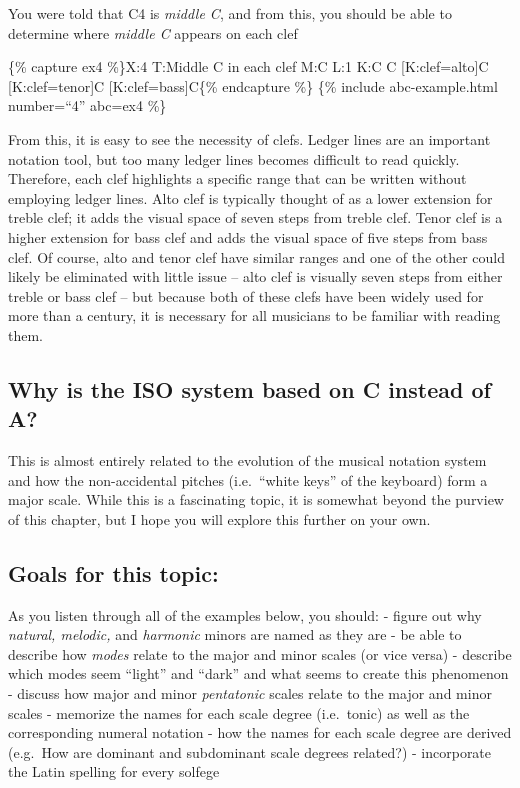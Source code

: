 \documentclass{book}
\begin{document}
You were told that C4 is \emph{middle C}, and from this, you should be able to
determine where \emph{middle C} appears on each clef

\{\% capture ex4 \%\}X:4 T:Middle C in each clef M:C L:1 K:C C\textbar{}
{[}K:clef=alto{]}C\textbar{} {[}K:clef=tenor{]}C\textbar{}
{[}K:clef=bass{]}C\textbar{]}\{\% endcapture \%\} \{\% include
abc-example.html number=``4'' abc=ex4 \%\}

From this, it is easy to see the necessity of clefs. Ledger lines are an
important notation tool, but too many ledger lines becomes difficult to read
quickly. Therefore, each clef highlights a specific range that can be written
without employing ledger lines. Alto clef is typically thought of as a lower
extension for treble clef; it adds the visual space of seven steps from treble
clef. Tenor clef is a higher extension for bass clef and adds the visual space
of five steps from bass clef. Of course, alto and tenor clef have similar
ranges and one of the other could likely be eliminated with little issue --
alto clef is visually seven steps from either treble or bass clef -- but
because both of these clefs have been widely used for more than a century, it
is necessary for all musicians to be familiar with reading them.

\hypertarget{why-is-the-iso-system-based-on-c-instead-of-a}{%
\subsection{Why is the ISO system based on C instead of
A?}\label{why-is-the-iso-system-based-on-c-instead-of-a}}

This is almost entirely related to the evolution of the musical notation
system and how the non-accidental pitches (i.e.~``white keys'' of the
keyboard) form a major scale. While this is a fascinating topic, it is
somewhat beyond the purview of this chapter, but I hope you will explore this
further on your own.

\hypertarget{goals-for-this-topic-10}{%
\subsection{Goals for this topic:}\label{goals-for-this-topic-10}}

As you listen through all of the examples below, you should: - figure out why
\emph{natural, melodic,} and \emph{harmonic} minors are named as they are - be
able to describe how \emph{modes} relate to the major and minor scales (or
vice versa) - describe which modes seem ``light'' and ``dark'' and what seems
to create this phenomenon - discuss how major and minor \emph{pentatonic}
scales relate to the major and minor scales - memorize the names for each
scale degree (i.e.~tonic) as well as the corresponding numeral notation - how
the names for each scale degree are derived (e.g.~How are dominant and
subdominant scale degrees related?) - incorporate the Latin spelling for every
solfege
\end{document}
